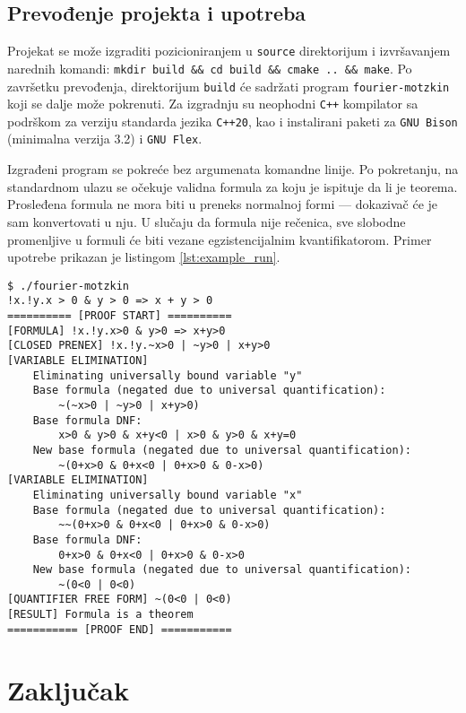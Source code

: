 \documentclass[a4paper,10pt]{article}
\begin{document}
\subsection{Prevođenje projekta i upotreba}

Projekat se može izgraditi pozicioniranjem u \texttt{source} direktorijum i izvršavanjem narednih komandi: \texttt{mkdir build \&\& cd build \&\& cmake .. \&\& make}. Po završetku prevođenja, direktorijum \texttt{build} će sadržati program \texttt{fourier-motzkin} koji se dalje može pokrenuti. Za izgradnju su neophodni \texttt{C++} kompilator sa podrškom za verziju standarda jezika \texttt{C++20}, kao i instalirani paketi za \texttt{GNU Bison} (minimalna verzija 3.2) i \texttt{GNU Flex}.

Izgrađeni program se pokreće bez argumenata komandne linije. Po pokretanju, na standardnom ulazu se očekuje validna formula za koju je ispituje da li je teorema. Prosleđena formula ne mora biti u preneks normalnoj formi --- dokazivač će je sam konvertovati u nju. U slučaju da formula nije rečenica, sve slobodne promenljive u formuli će biti vezane egzistencijalnim kvantifikatorom. Primer upotrebe prikazan je listingom \ref{lst:example_run}.


\begin{lstlisting}[basicstyle=\ttfamily\small,captionpos=b,caption={Primer pokretanja \texttt{fourier-motzkin} programa}, label=lst:example_run]
$ ./fourier-motzkin
!x.!y.x > 0 & y > 0 => x + y > 0
========== [PROOF START] ==========
[FORMULA] !x.!y.x>0 & y>0 => x+y>0
[CLOSED PRENEX] !x.!y.~x>0 | ~y>0 | x+y>0
[VARIABLE ELIMINATION]
    Eliminating universally bound variable "y"
    Base formula (negated due to universal quantification):
        ~(~x>0 | ~y>0 | x+y>0)
    Base formula DNF:
        x>0 & y>0 & x+y<0 | x>0 & y>0 & x+y=0
    New base formula (negated due to universal quantification):
        ~(0+x>0 & 0+x<0 | 0+x>0 & 0-x>0)
[VARIABLE ELIMINATION]
    Eliminating universally bound variable "x"
    Base formula (negated due to universal quantification):
        ~~(0+x>0 & 0+x<0 | 0+x>0 & 0-x>0)
    Base formula DNF:
        0+x>0 & 0+x<0 | 0+x>0 & 0-x>0
    New base formula (negated due to universal quantification):
        ~(0<0 | 0<0)
[QUANTIFIER FREE FORM] ~(0<0 | 0<0)
[RESULT] Formula is a theorem
=========== [PROOF END] ===========
\end{lstlisting}

\section{Zaključak}
\label{sec:zakljucak}
\end{document}
